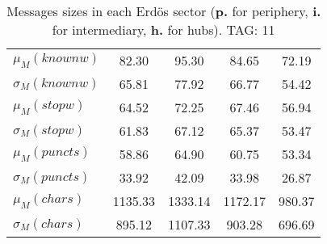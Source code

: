 \begin{table}[h!]
\begin{center}
\begin{tabular}{| l || c | c | c | c |}
$\mu_M(knownw)$ & 82.30  & 95.30  & 84.65  & 72.19 \\
$\sigma_M(knownw)$ & 65.81  & 77.92  & 66.77  & 54.42 \\\hline
$\mu_M(stopw)$ & 64.52  & 72.25  & 67.46  & 56.94 \\
$\sigma_M(stopw)$ & 61.83  & 67.12  & 65.37  & 53.47 \\\hline
$\mu_M(puncts)$ & 58.86  & 64.90  & 60.75  & 53.34 \\
$\sigma_M(puncts)$ & 33.92  & 42.09  & 33.98  & 26.87 \\\hline
$\mu_M(chars)$ & 1135.33  & 1333.14  & 1172.17  & 980.37 \\
$\sigma_M(chars)$ & 895.12  & 1107.33  & 903.28  & 696.69 \\\hline
\end{tabular}
\caption{Messages sizes in each Erd\"os sector ({{\bf p.}} for periphery, {{\bf i.}} for intermediary, {{\bf h.}} for hubs). TAG: 11}
\end{center}
\end{table}